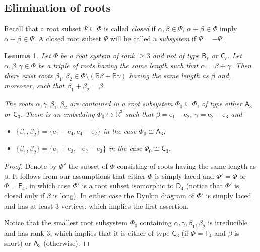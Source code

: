 \documentclass{article}
\newtheorem{lemma}{Lemma} \numberwithin{lemma}{section}
\theoremstyle{definition}
\theoremstyle{remark}
\newcommand{\rA}{\mathsf{A}}
\newcommand{\rB}{\mathsf{B}}
\newcommand{\rC}{\mathsf{C}}
\newcommand{\rD}{\mathsf{D}}
\newcommand{\rF}{\mathsf{F}}
\begin{document}
\subsection{Elimination of roots}
Recall that a root subset $\Psi \subseteq \Phi$ is called {\it closed} if $\alpha, \beta \in \Psi$, $\alpha+\beta\in\Phi$ imply $\alpha+\beta\in \Psi$. A closed root subset $\Psi$ will be called a {\it subsystem} if $\Psi = -\Psi$.

\begin{lemma}\label{ThreeRoots}
Let \(\Phi\) be a root system of rank \(\geq 3\) and not of type \(\rB_\ell\) or \(\rC_\ell\). Let \(\alpha, \beta, \gamma \in \Phi\) be a triple of roots having the same length such that $\alpha = \beta + \gamma$.  
Then there exist roots \(\beta_1, \beta_2 \in \Phi \setminus (\mathbb R\beta + \mathbb R\gamma)\) having the same length as $\beta$ and, moreover, such that \(\beta_1 + \beta_2 = \beta\).

The roots $\alpha, \gamma, \beta_1, \beta_2$ are contained in a root subsystem $\Phi_0 \subseteq \Phi$, of type either \(\rA_3\) or \(\rC_3\). There is an embedding \(\Phi_0 \hookrightarrow  \mathbb R^3\) such that \(\beta = \mathrm e_1 - \mathrm e_2\), \(\gamma = \mathrm e_2 - \mathrm e_3\) and 
\begin{itemize}
 \item \(\{\beta_1, \beta_2\} = \{\mathrm e_1 - \mathrm e_4, \mathrm e_4 - \mathrm e_2\}\) in the case \(\Phi_0\cong\rA_3\);
 \item \(\{\beta_1, \beta_2\} = \{\mathrm e_1 + \mathrm e_3, -\mathrm e_2 - \mathrm e_3\}\) in the case \(\Phi_0\cong\rC_3\).
\end{itemize}
\end{lemma}
\begin{proof}
Denote by $\Phi'$ the subset of $\Phi$ consisting of roots having the same length as $\beta$.
It follows from our assumptions that either $\Phi$ is simply-laced and $\Phi' = \Phi$ or $\Phi = \rF_4$, in which case $\Phi'$ is a root subset isomorphic to $\rD_4$ (notice that $\Phi'$ is closed only if $\beta$ is long). In either case the Dynkin diagram of $\Phi'$ is simply laced and has at least $3$ vertices, which implies the first assertion.

Notice that the smallest root subsystem $\Phi_0$ containing $\alpha, \gamma, \beta_1, \beta_2$ is irreducible and has rank $3$, which implies that it is either of type  $\rC_3$ (if $\Phi = \rF_4$ and $\beta$ is short) or $\rA_3$ (otherwise). \end{proof}
\end{document}
